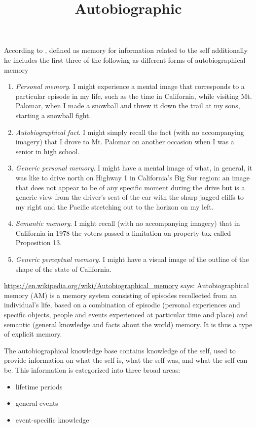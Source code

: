 \documentclass[a4paper]{article}
\title{Autobiographic}
\begin{document}
    \maketitle
    According to \cite{brewer-1986-what-is-autobiographical-memory}, defined as memory for information related to the self additionally he includes the first three of the following as different forms of autobiographical memory
    \begin{enumerate}
        \item \textit{Personal memory}. I might experience a mental image that corresponds to a particular episode in my life, such as the time in California, while visiting Mt. Palomar, when I made a snowball and threw it down the trail at my sons, starting a snowball fight.
        \item \textit{Autobiographical fact}. I might simply recall the fact (with no accompanying imagery) that I drove to Mt. Palomar on another occasion when I was a senior in high school.
        \item \textit{Generic personal memory}. I might have a mental image of what, in general, it was like to drive north on Highway 1 in California’s Big Sur region: an image that does not appear to be of any specific moment during the drive but is a generic view from the driver’s seat of the car with the sharp jagged cliffs to my right and the Pacific stretching out to the horizon on my left.
        \item \textit{Semantic memory}. I might recall (with no accompanying imagery) that in California in 1978 the voters passed a limitation on property tax called Proposition 13.
        \item \textit{Generic perceptual memory}. I might have a visual image of the outline of the shape of the state of California.
    \end{enumerate}
    
    
    
    
    \url{https://en.wikipedia.org/wiki/Autobiographical_memory} says:
    Autobiographical memory (AM) is a memory system consisting of episodes recollected from an individual's life, based on a combination of episodic (personal experiences and specific objects, people and events experienced at particular time and place) and semantic (general knowledge and facts about the world) memory. It is thus a type of explicit memory.
    
    The autobiographical knowledge base contains knowledge of the self, used to provide information on what the self is, what the self was, and what the self can be. This information is categorized into three broad areas:
    \begin{itemize}
        \item lifetime periods
        \item general events
        \item event-specific knowledge
    \end{itemize}
    
\end{document}
